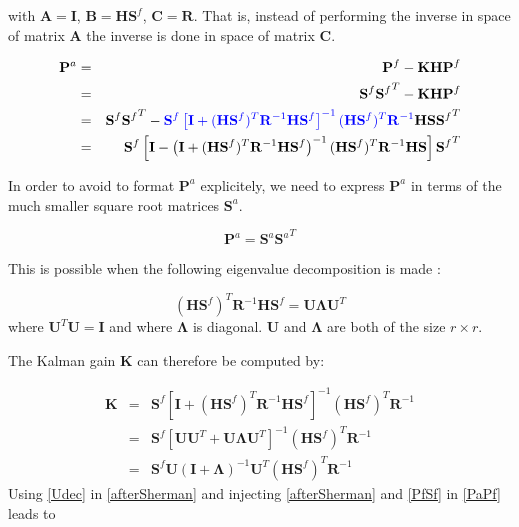 \documentclass[a4paper,12pt]{article}
\begin{document}
with $\mathbf A= \mathbf I$, $\mathbf B=\mathbf{HS}^f$, $\mathbf{C}=\mathbf{R}$.
That is, instead of performing the inverse in space of matrix $\mathbf{A}$ the inverse is done in space of matrix $\mathbf C$.\newline

\begin{eqnarray}
\mathbf{P}^a
&=&
\mathbf P^f - \mathbf K \mathbf H \mathbf P^f \\
&=&
\mathbf S^f {\mathbf S^f}^T - \mathbf K \mathbf H \mathbf P^f \\
&=&
\mathbf S^f {\mathbf S^f}^T
-
{\color{blue}\mathbf S^f\left[\mathbf I + (\mathbf H \mathbf S^f)^T\mathbf R^{-1} \mathbf H \mathbf S^f\right]^{-1}(\mathbf H \mathbf S^f)^T\mathbf R^{-1}}
\mathbf H \mathbf S {\mathbf S^f}^T \\
&=&
\mathbf S^f 
\left[ 
\mathbf I
-
\left(\mathbf I + (\mathbf H \mathbf S^f)^T\mathbf R^{-1} \mathbf H \mathbf S^f\right)^{-1}(\mathbf H \mathbf S^f)^T\mathbf R^{-1}
\mathbf H \mathbf S 
\right] {\mathbf S^f}^T 
\end{eqnarray}

In order to avoid to format $\mathbf P^a$ explicitely, we need to express $\mathbf P^a$ in terms of the much smaller square root matrices $\mathbf S^a$.

\begin{equation}
 \mathbf P^a = \mathbf S^a {\mathbf S^a}^T
\end{equation}

This is possible when the following eigenvalue decomposition is made :

\begin{equation}
\left(\mathbf H \mathbf S^f\right)^T  \mathbf R^{-1} \mathbf H \mathbf S^f
= 
\mathbf U \mathbf \Lambda \mathbf U^T \label{Udec}
\end{equation} 
where $\mathbf U^T \mathbf U = \mathbf I$ and where $\mathbf \Lambda$ is
diagonal.
 $\mathbf U$ and $\mathbf \Lambda$ are both of the size $r \times r$.\newline  

The Kalman gain $\mathbf K$ can therefore be computed
by:


\begin{eqnarray}
 \mathbf K 
&=&
\mathbf S^f
\left[
\mathbf I + (\mathbf H \mathbf S^f)^T\mathbf R^{-1} \mathbf H \mathbf S^f 
\right]^{-1}
(\mathbf H \mathbf S^f)^T\mathbf R^{-1} \\
&=&
\mathbf S^f
\left[
\mathbf U \mathbf U^T + \mathbf U \mathbf \Lambda \mathbf U^T
\right]^{-1}
(\mathbf H \mathbf S^f)^T\mathbf R^{-1} \\
&=&
 \mathbf S^f \mathbf U (\mathbf I + \mathbf \Lambda)^{-1} \mathbf U^T (\mathbf H \mathbf S^f)^T \mathbf R^{-1}\label{KU}
\end{eqnarray}
Using \eqref{Udec} in \eqref{afterSherman} and injecting \eqref{afterSherman} and \eqref{PfSf} in \eqref{PaPf} leads to
\end{document}

